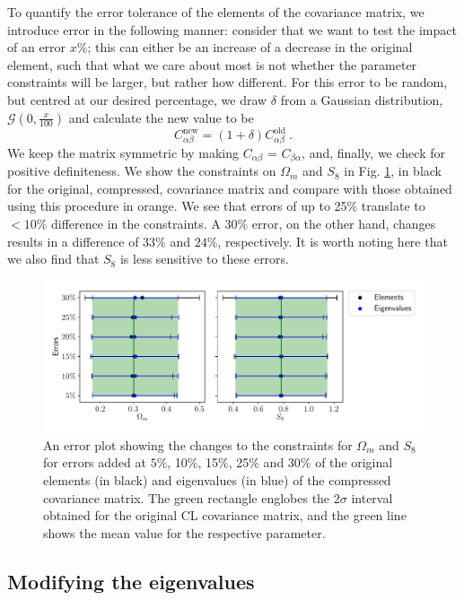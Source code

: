 \documentclass[twocolumn]{\docclass}
\newcommand{\rf}[1]{\ref{fig:#1}}
\newcommand\be{\begin{equation}}
\newcommand\ee{\end{equation}}
\begin{document}
	To quantify the error tolerance of the elements of the covariance matrix, we introduce error in the following manner: consider that we want to test the impact of an error $x \%$; this can either be an increase of a decrease in the original element, such that what we care about most is not whether the parameter constraints will be larger, but rather how different. For this error to be random, but centred at our desired percentage, we draw $\delta$ from a Gaussian distribution, $\mathcal{G}(0,\frac{x}{100})$ and calculate the new value to be
	\be \label{eq:tolerance}
	C_{\alpha \beta}^{\mathrm{new}} = (1 + \delta)C_{\alpha \beta}^{\mathrm{old}}\ .
	\ee
	We keep the matrix symmetric by making $C_{\alpha \beta}$ = $C_{\beta \alpha}$, and, finally, we check for positive definiteness. We show the constraints on $\Omega_m$ and $S_8$ in Fig. \rf{tolerance}, in black for the original, compressed, covariance matrix and compare with those obtained using this procedure in orange. We see that errors of up to 25\% translate to $< 10\%$ difference in the constraints. A $30\%$ error, on the other hand, changes results in a difference of $33\%$ and $24\%$, respectively. It is worth noting here that we also find that $S_8$ is less sensitive to these errors.
	
		\begin{figure}
		\includegraphics[width=\columnwidth]{Tolerance_errors.pdf}
		\caption{An error plot showing the changes to the constraints for $\Omega_m$ and $S_8$ for errors added at $5\%$, 10\%, 15\%, 25\% and 30\% of the original elements (in black) and eigenvalues (in blue) of the compressed covariance matrix. The green rectangle englobes the $2 \sigma$ interval obtained for the original CL covariance matrix, and the green line shows the mean value for the respective parameter. } \label{fig:tolerance}
	\end{figure}
	
	\subsection{Modifying the eigenvalues}
	
\end{document}
